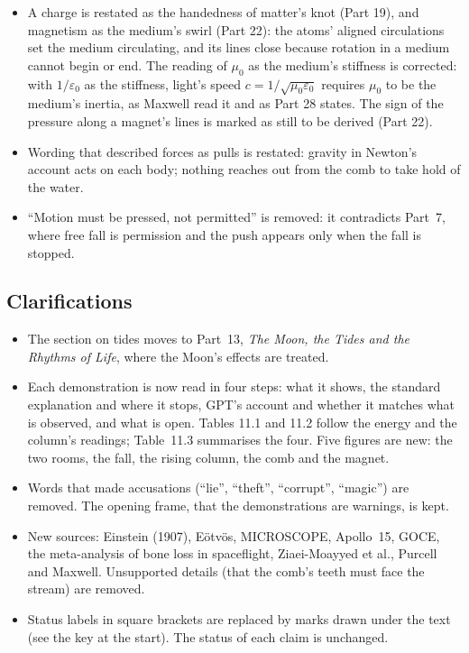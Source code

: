 \begin{itemize}
  \item A charge is restated as the handedness of matter's knot (Part 19), and magnetism as the medium's swirl (Part 22): the atoms' aligned circulations set the medium circulating, and its lines close because rotation in a medium cannot begin or end. The reading of $\mu_0$ as the medium's stiffness is corrected: with $1/\varepsilon_0$ as the stiffness, light's speed $c = 1/\sqrt{\mu_0\varepsilon_0}$ requires $\mu_0$ to be the medium's inertia, as Maxwell read it and as Part 28 states. The sign of the pressure along a magnet's lines is marked as still to be derived (Part 22).
  \item Wording that described forces as pulls is restated: gravity in Newton's account acts on each body; nothing reaches out from the comb to take hold of the water.
  \item ``Motion must be pressed, not permitted'' is removed: it contradicts Part~7, where free fall is permission and the push appears only when the fall is stopped.
\end{itemize}

\subsection*{Clarifications}
\begin{itemize}
  \item The section on tides moves to Part~13, \emph{The Moon, the Tides and the Rhythms of Life}, where the Moon's effects are treated.
  \item Each demonstration is now read in four steps: what it shows, the standard explanation and where it stops, GPT's account and whether it matches what is observed, and what is open. Tables 11.1 and 11.2 follow the energy and the column's readings; Table~11.3 summarises the four. Five figures are new: the two rooms, the fall, the rising column, the comb and the magnet.
  \item Words that made accusations (``lie'', ``theft'', ``corrupt'', ``magic'') are removed. The opening frame, that the demonstrations are warnings, is kept.
  \item New sources: Einstein (1907), E\"otv\"os, MICROSCOPE, Apollo~15, GOCE, the meta-analysis of bone loss in spaceflight, Ziaei-Moayyed et al., Purcell and Maxwell. Unsupported details (that the comb's teeth must face the stream) are removed.
  \item Status labels in square brackets are replaced by marks drawn under the text (see the key at the start). The status of each claim is unchanged.
\end{itemize}

\newpage




